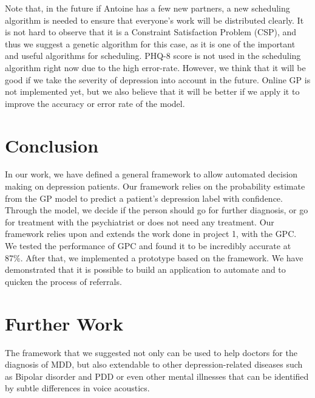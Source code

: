 \documentclass{article}
\begin{document}
    
    Note that, in the future if Antoine has a few new partners, a new scheduling algorithm is needed to ensure that everyone's work will be distributed clearly.
    It is not hard to observe that it is a Constraint Satisfaction Problem (CSP), and thus we suggest a genetic algorithm for this case, 
    as it is one of the important and useful algorithms for scheduling. 
    PHQ-8 score is not used in the scheduling algorithm right now due to the high error-rate. 
    However, we think that it will be good if we take the severity of depression into account in the future. 
    Online GP is not implemented yet, but we also believe that it will be better if we apply it to improve the accuracy or error rate of the model.
    
    
    \section{Conclusion}    
        In our work, we have defined a general framework to allow automated decision making on depression patients. Our framework relies on the probability estimate from the GP model to predict a patient's depression label with confidence. Through the model, we decide if the person should go for further diagnosis, or go for treatment with the psychiatrist or does not need any treatment. Our framework relies upon and extends the work done in project 1, with the GPC. We tested the performance of GPC and found it to be incredibly accurate at 87\%. After that, we implemented a prototype based on the framework. We have demonstrated that it is possible to build an application to automate and to quicken the process of referrals.
    
    \section{Further Work}
    The framework that we suggested not only can be used to help doctors for the diagnosis of MDD, but also extendable to other depression-related 
    diseases such as Bipolar disorder and PDD or even other mental illnesses that can be identified by subtle differences in voice acoustics. 

    
\end{document}
